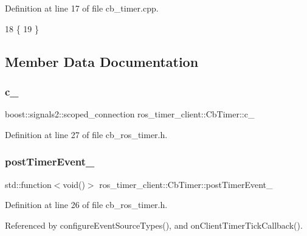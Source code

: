 Definition at line 17 of file cb\+\_\+timer.\+cpp.


\begin{DoxyCode}
18 \{
19 \}
\end{DoxyCode}


\subsection{Member Data Documentation}
\mbox{\label{classros__timer__client_1_1CbTimer_a755a7f5d8662ae3b7507da0fe82e5b22}} 
\subsubsection{\texorpdfstring{c\+\_\+}{c\_}}
{\footnotesize\ttfamily boost\+::signals2\+::scoped\+\_\+connection ros\+\_\+timer\+\_\+client\+::\+Cb\+Timer\+::c\+\_\+\hspace{0.3cm}{\ttfamily [private]}}



Definition at line 27 of file cb\+\_\+ros\+\_\+timer.\+h.

\mbox{\label{classros__timer__client_1_1CbTimer_a7e15bf1451d17c96aba814dc3e5c08e9}} 
\subsubsection{\texorpdfstring{post\+Timer\+Event\+\_\+}{postTimerEvent\_}}
{\footnotesize\ttfamily std\+::function$<$void()$>$ ros\+\_\+timer\+\_\+client\+::\+Cb\+Timer\+::post\+Timer\+Event\+\_\+\hspace{0.3cm}{\ttfamily [private]}}



Definition at line 26 of file cb\+\_\+ros\+\_\+timer.\+h.



Referenced by configure\+Event\+Source\+Types(), and on\+Client\+Timer\+Tick\+Callback().

